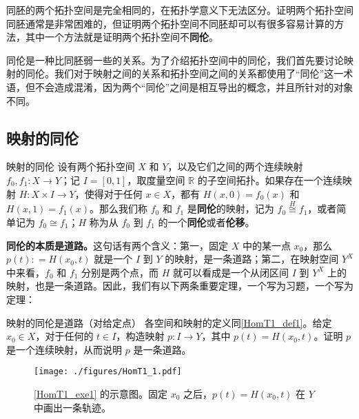
同胚的两个拓扑空间是完全相同的，在拓扑学意义下无法区分。证明两个拓扑空间同胚通常是非常困难的，但证明两个拓扑空间不同胚却可以有很多容易计算的方法，其中一个方法就是证明两个拓扑空间不\textbf{同伦}。

同伦是一种比同胚弱一些的关系。为了介绍拓扑空间中的同伦，我们首先要讨论映射的同伦。我们对于映射之间的关系和拓扑空间之间的关系都使用了“同伦”这一术语，但不会造成混淆，因为两个“同伦”之间是相互导出的概念，并且所针对的对象不同。

\subsection{映射的同伦}

\begin{definition}{映射的同伦}\label{HomT1_def1}
设有两个拓扑空间 $X$ 和 $Y$，以及它们之间的两个连续映射 $f_0, f_1:X\rightarrow Y$；记 $I=[0, 1]$，取度量空间 $\mathbb{R}$ 的子空间拓扑。如果存在一个连续映射 $H: X\times I\rightarrow Y$，使得对于任何 $x\in X$，都有 $H(x, 0)=f_0(x)$ 和 $H(x, 1)=f_1(x)$。那么我们称 $f_0$ 和 $f_1$ 是\textbf{同伦}的映射，记为 $f_0\overset{H}{\cong} f_1$，或者简单记为 $f_0\cong f_1$；$H$ 称为从 $f_0$ 到 $f_1$ 的一个\textbf{同伦}或者\textbf{伦移}。

\end{definition}

\textbf{同伦的本质是道路。}这句话有两个含义：第一，固定 $X$ 中的某一点 $x_0$，那么 $p(t): = H(x_0, t)$ 就是一个 $I$ 到 $Y$ 的映射，是一条道路；第二，在映射空间 $Y^X$ 中来看，$f_0$ 和 $f_1$ 分别是两个点，而 $H$ 就可以看成是一个从闭区间 $I$ 到 $Y^X$ 上的映射，也是一条道路。因此，我们有以下两条重要定理，一个写为习题，一个写为定理：

\begin{exercise}{映射的同伦是道路（对给定点）}\label{HomT1_exe1}
各空间和映射的定义同\autoref{HomT1_def1}。给定 $x_0\in X$，对于任何的 $t\in I$，构造映射 $p:I\rightarrow Y$，其中 $p(t)=H(x_0, t)$。证明 $p$ 是一个连续映射，从而说明 $p$ 是一条道路。
\end{exercise}

\begin{figure}[ht]
\centering
\texttt{[image: ./figures/HomT1\_1.pdf]}
\caption{\autoref{HomT1_exe1} 的示意图。固定 $x_0$ 之后，$p(t)=H(x_0, t)$ 在 $Y$ 中画出一条轨迹。} \label{HomT1_fig1}
\end{figure}



